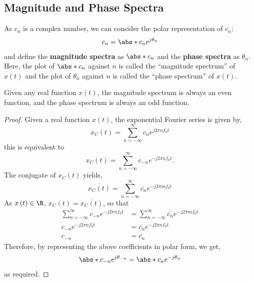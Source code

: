 \documentclass{article}
\begin{document}
\subsection{Magnitude and Phase Spectra}
As \(c_n\) is a complex number, we can consider the polar representation
of \(c_n\):
\begin{equation*}
    c_n = \abs*{c_n} e^{j \theta_n}
\end{equation*}
and define the \textbf{magnitude spectra} as \(\abs*{c_n}\) and the
\textbf{phase spectra} as \(\theta_n\). Here, the plot of \(\abs*{c_n}\)
against \(n\) is called the ``magnitude spectrum'' of
\(x\left( t \right)\) and the plot of \(\theta_n\) against \(n\) is
called the ``phase spectrum'' of \(x\left( t \right)\).
\begin{theorem}
    Given any real function \(x\left( t \right)\), the magnitude spectrum is always an even function,
    and the phase spectrum is always an odd function.
\end{theorem}
\begin{proof}
    Given a real function \(x\left( t \right)\), the exponential Fourier series is given by,
    \begin{equation*}
        x_C\left( t \right) = \sum_{n = -\infty}^\infty c_n e^{j 2\pi n f_0 t}
    \end{equation*}
    this is equivalent to
    \begin{equation*}
        x_C\left( t \right) = \sum_{n = -\infty}^\infty c_{-n} e^{-j 2\pi n f_0 t}.
    \end{equation*}
    The conjugate of \(x_C\left( t \right)\) yields,
    \begin{equation*}
        \overline{x_C\left( t \right)} = \sum_{n = -\infty}^\infty \overline{c_{n}} e^{-j 2\pi m f_0 t}
    \end{equation*}
    As \(x\left( t \right) \in \R\), \(x_C\left( t \right) = \overline{x_C\left( t \right)}\), so that
    \begin{align*}
        \sum_{n = -\infty}^\infty c_{-n} e^{-j 2\pi n f_0 t} & = \sum_{n = -\infty}^\infty \overline{c_{n}} e^{-j 2\pi m f_0 t} \\
        c_{-n} e^{-j 2\pi n f_0 t}                           & = \overline{c_n} e^{-j 2\pi n f_0 t}                             \\
        c_{-n}                                               & = \overline{c_n}
    \end{align*}
    Therefore, by representing the above coefficients in polar form, we get,
    \begin{equation*}
        \abs*{c_{-n}} e^{j \theta_{-n}} = \abs*{c_n} e^{-j \theta_n}
    \end{equation*}
    as required.
\end{proof}
\end{document}
